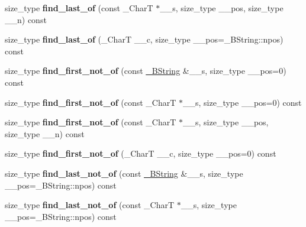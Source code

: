 \begin{DoxyCompactItemize}
size\+\_\+type {\bfseries find\+\_\+last\+\_\+of} (const \+\_\+\+CharT $\ast$\+\_\+\+\_\+s, size\+\_\+type \+\_\+\+\_\+pos, size\+\_\+type \+\_\+\+\_\+n) const
\item 
\mbox{\label{class____bstr__sum_aa217e9c3491c52f9b2dd3c41ac01ccf7}} 
size\+\_\+type {\bfseries find\+\_\+last\+\_\+of} (\+\_\+\+CharT \+\_\+\+\_\+c, size\+\_\+type \+\_\+\+\_\+pos=\+\_\+\+B\+String\+::npos) const
\item 
\mbox{\label{class____bstr__sum_a0328b8d14bc6b731e7ad302cd47eaebd}} 
size\+\_\+type {\bfseries find\+\_\+first\+\_\+not\+\_\+of} (const \hyperlink{classbasic__string}{\+\_\+\+B\+String} \&\+\_\+\+\_\+s, size\+\_\+type \+\_\+\+\_\+pos=0) const
\item 
\mbox{\label{class____bstr__sum_abe37fb4b48da579c5899996bb67277a5}} 
size\+\_\+type {\bfseries find\+\_\+first\+\_\+not\+\_\+of} (const \+\_\+\+CharT $\ast$\+\_\+\+\_\+s, size\+\_\+type \+\_\+\+\_\+pos=0) const
\item 
\mbox{\label{class____bstr__sum_a3de16d471c2c475cf4ed510a2d54f5bf}} 
size\+\_\+type {\bfseries find\+\_\+first\+\_\+not\+\_\+of} (const \+\_\+\+CharT $\ast$\+\_\+\+\_\+s, size\+\_\+type \+\_\+\+\_\+pos, size\+\_\+type \+\_\+\+\_\+n) const
\item 
\mbox{\label{class____bstr__sum_a002de728d34b064133a1671b89025c44}} 
size\+\_\+type {\bfseries find\+\_\+first\+\_\+not\+\_\+of} (\+\_\+\+CharT \+\_\+\+\_\+c, size\+\_\+type \+\_\+\+\_\+pos=0) const
\item 
\mbox{\label{class____bstr__sum_a8ac9288425ef08e4a6b76a710dc4e15a}} 
size\+\_\+type {\bfseries find\+\_\+last\+\_\+not\+\_\+of} (const \hyperlink{classbasic__string}{\+\_\+\+B\+String} \&\+\_\+\+\_\+s, size\+\_\+type \+\_\+\+\_\+pos=\+\_\+\+B\+String\+::npos) const
\item 
\mbox{\label{class____bstr__sum_a783e3e0a386f725bac53d6f379962ba6}} 
size\+\_\+type {\bfseries find\+\_\+last\+\_\+not\+\_\+of} (const \+\_\+\+CharT $\ast$\+\_\+\+\_\+s, size\+\_\+type \+\_\+\+\_\+pos=\+\_\+\+B\+String\+::npos) const
\item 

\end{DoxyCompactItemize}
